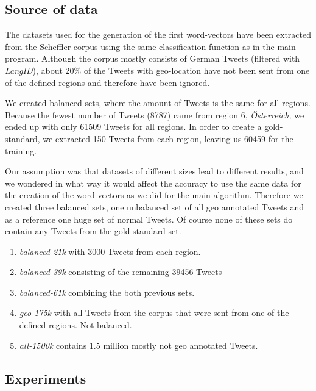 \documentclass[../Main.tex]{subfiles}
\begin{document}
\subsection{Source of data}
The datasets used for the generation of the first word-vectors have been extracted from the Scheffler-corpus using the same classification function as in the main program. Although the corpus mostly consists of German Tweets (filtered with \emph{LangID}), about 20\% of the Tweets with geo-location have not been sent from one of the defined regions and therefore have been ignored.

We created balanced sets, where the amount of Tweets is the same for all regions. Because the fewest number of Tweets (8787) came from region 6, \textit{Österreich,} we ended up with only 61509 Tweets for all regions. In order to create a gold-standard, we extracted 150 Tweets from each region, leaving us 60459 for the training.

Our assumption was that datasets of different sizes lead to different results, and we wondered in what way it would affect the accuracy to use the same data for the creation of the word-vectors as we did for the main-algorithm. Therefore we created three balanced sets, one unbalanced set of all geo annotated Tweets and as a reference one huge set of normal Tweets. Of course none of these sets do contain any Tweets from the gold-standard set.

\begin{enumerate}
\item \emph{balanced-21k} with 3000 Tweets from each region.
\item \emph{balanced-39k} consisting of the remaining 39456 Tweets
\item \emph{balanced-61k} combining the both previous sets. 
\item \emph{geo-175k} with all Tweets from the corpus that were sent from one of the defined regions. Not balanced.
\item \emph{all-1500k} contains 1.5 million mostly not geo annotated Tweets.
\end{enumerate}

\subsection{Experiments}
\end{document}
